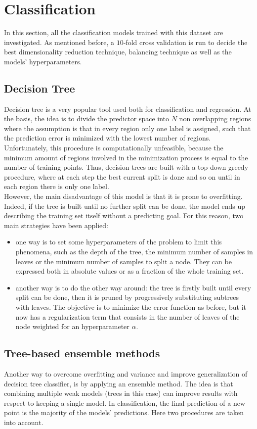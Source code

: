 \documentclass[letterpaper]{article}
\begin{document}
	\section{Classification} \label{classification}
	In this section, all the classification models trained with this dataset are investigated. As mentioned before, a $10$-fold cross validation is run to decide the best dimensionality reduction technique, balancing technique as well as the models' hyperparameters. 
	\subsection{Decision Tree}
	Decision tree is a very popular tool used both for classification and regression. At the basis, the idea is to divide the predictor space into $N$ non overlapping regions where the assumption is that in every region only one label is assigned, such that the prediction error is minimized with the lowest number of regions. Unfortunately, this procedure is computationally unfeasible, because the minimum amount of regions involved in the minimization process is equal to the number of training points. Thus, decision trees are built with a top-down greedy procedure, where at each step the best current split is done and so on until in each region there is only one label. \\
	However, the main disadvantage of this model is that it is prone to overfitting. Indeed, if the tree is built until no further split can be done, the model ends up describing the training set itself without a predicting goal. For this reason, two main strategies have been applied:
	\begin{itemize}
		\item one way is to set some hyperparameters of the problem to limit this phenomena, such as the depth of the tree, the minimum number of samples in leaves or the minimum number of samples to split a node. They can be expressed both in absolute values or as a fraction of the whole training set.
		\item another way is to do the other way around: the tree is firstly built until every split can be done, then it is pruned by progressively substituting subtrees with leaves. The objective is to minimize the error function as before, but it now has a regularization term that consists in the number of leaves of the node weighted for an hyperparameter $\alpha$.
	\end{itemize}
	
	\subsection{Tree-based ensemble methods}
	Another way to overcome overfitting and variance and improve generalization of decision tree classifier, is by applying an ensemble method. The idea is that combining multiple weak models (trees in this case) can improve results with respect to keeping a single model. In classification, the final prediction of a new point is the majority of the models' predictions. Here two procedures are taken into account.
\end{document}
